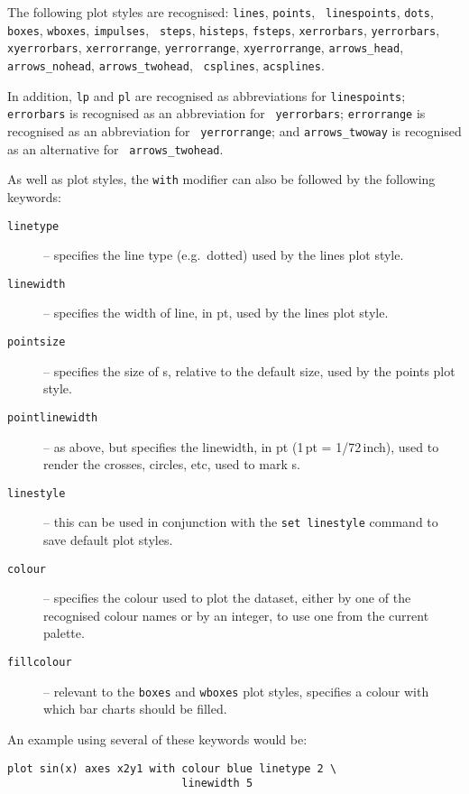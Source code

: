 \label{sec:list_of_plotstyles}
The following plot styles are recognised: {\tt lines}, {\tt points}, {\tt
linespoints}, {\tt dots}, {\tt boxes}, {\tt wboxes}, {\tt impulses}, {\tt
steps}, {\tt histeps}, {\tt fsteps}, {\tt xerrorbars}, {\tt yerrorbars}, {\tt
xyerrorbars}, {\tt xerrorrange}, {\tt yerrorrange}, {\tt xyerrorrange},
\newline\noindent %
{\tt arrows\_head}, {\tt arrows\_nohead}, {\tt arrows\_twohead}, {\tt
csplines}, {\tt acsplines}.

In addition, {\tt lp} and {\tt pl} are recognised as abbreviations
for {\tt linespoints}; {\tt errorbars} is recognised as an abbreviation for {\tt
yerrorbars}; {\tt errorrange} is recognised as an abbreviation for {\tt
yerrorrange}; and {\tt arrows\_twoway} is recognised as an alternative for {\tt
arrows\_twohead}.

As well as plot styles, the {\tt with} modifier can also be followed by the
following keywords:

\begin{description}
\item[{\tt linetype}] -- specifies the line type (e.g.\ dotted) used by the lines plot style.
\item[{\tt linewidth}] -- specifies the width of line, in pt, used by the lines plot style.
\item[{\tt pointsize}] -- specifies the size of \datapoint s, relative to the
default size, used by the points plot style.
\item[{\tt pointlinewidth}] -- as above, but specifies the linewidth, in pt (1\,pt = 1/72\,inch),
used to render the crosses, circles, etc, used to mark \datapoint s.
\item[{\tt linestyle}] -- this can be used in conjunction with the {\tt set linestyle} command to save default plot styles.
\item[{\tt colour}] -- specifies the colour used to plot the dataset, either by
one of the recognised colour names or by an integer,
to use one from the current palette.  \item[{\tt fillcolour}] -- relevant to the
{\tt boxes} and {\tt wboxes} plot
styles, specifies a colour with which bar charts should be filled.
\end{description}

An example using several of these keywords would be:

\begin{verbatim}
plot sin(x) axes x2y1 with colour blue linetype 2 \
                           linewidth 5
\end{verbatim}


